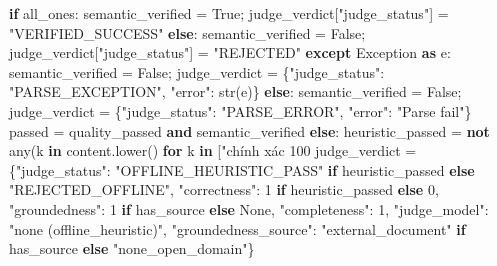 \documentclass[]{article}
\newenvironment{Shaded}{}{}
\newcommand{\BuiltInTok}[1]{#1}
\newcommand{\ConstantTok}[1]{\textcolor[rgb]{0.53,0.00,0.00}{#1}}
\newcommand{\ControlFlowTok}[1]{\textcolor[rgb]{0.00,0.44,0.13}{\textbf{#1}}}
\newcommand{\DataTypeTok}[1]{\textcolor[rgb]{0.56,0.13,0.00}{#1}}
\newcommand{\DecValTok}[1]{\textcolor[rgb]{0.25,0.63,0.44}{#1}}
\newcommand{\KeywordTok}[1]{\textcolor[rgb]{0.00,0.44,0.13}{\textbf{#1}}}
\newcommand{\NormalTok}[1]{#1}
\newcommand{\OperatorTok}[1]{\textcolor[rgb]{0.40,0.40,0.40}{#1}}
\newcommand{\StringTok}[1]{\textcolor[rgb]{0.25,0.44,0.63}{#1}}
\newcommand{\VariableTok}[1]{\textcolor[rgb]{0.10,0.09,0.49}{#1}}
\begin{document}
\begin{Shaded}
\begin{Highlighting}[]
\NormalTok{                    }\ControlFlowTok{if}\NormalTok{ all_ones:}
\NormalTok{                        semantic_verified }\OperatorTok{=} \ConstantTok{True}\NormalTok{; judge_verdict[}\StringTok{"judge_status"}\NormalTok{] }\OperatorTok{=} \StringTok{"VERIFIED_SUCCESS"}
\NormalTok{                    }\ControlFlowTok{else}\NormalTok{:}
\NormalTok{                        semantic_verified }\OperatorTok{=} \ConstantTok{False}\NormalTok{; judge_verdict[}\StringTok{"judge_status"}\NormalTok{] }\OperatorTok{=} \StringTok{"REJECTED"}
\NormalTok{                }\ControlFlowTok{except} \DataTypeTok{Exception} \KeywordTok{as}\NormalTok{ e:}
\NormalTok{                    semantic_verified }\OperatorTok{=} \ConstantTok{False}\NormalTok{; judge_verdict }\OperatorTok{=}\NormalTok{ \{}\StringTok{"judge_status"}\NormalTok{: }\StringTok{"PARSE_EXCEPTION"}\NormalTok{, }\StringTok{"error"}\NormalTok{: }\BuiltInTok{str}\NormalTok{(e)\}}
\NormalTok{            }\ControlFlowTok{else}\NormalTok{:}
\NormalTok{                semantic_verified }\OperatorTok{=} \ConstantTok{False}\NormalTok{; judge_verdict }\OperatorTok{=}\NormalTok{ \{}\StringTok{"judge_status"}\NormalTok{: }\StringTok{"PARSE_ERROR"}\NormalTok{, }\StringTok{"error"}\NormalTok{: }\StringTok{"Parse fail"}\NormalTok{\}}
\NormalTok{            passed }\OperatorTok{=}\NormalTok{ quality_passed }\KeywordTok{and}\NormalTok{ semantic_verified}
\NormalTok{        }\ControlFlowTok{else}\NormalTok{:}
\NormalTok{            heuristic_passed }\OperatorTok{=} \KeywordTok{not} \BuiltInTok{any}\NormalTok{(k }\KeywordTok{in}\NormalTok{ content.lower() }\ControlFlowTok{for}\NormalTok{ k }\KeywordTok{in}\NormalTok{ [}\StringTok{"chính xác 100%
\NormalTok{            judge_verdict }\OperatorTok{=}\NormalTok{ \{}\StringTok{"judge_status"}\NormalTok{: }\StringTok{"OFFLINE_HEURISTIC_PASS"}\NormalTok{ }\ControlFlowTok{if}\NormalTok{ heuristic_passed }\ControlFlowTok{else} \StringTok{"REJECTED_OFFLINE"}\NormalTok{,}
\NormalTok{                             }\StringTok{"correctness"}\NormalTok{: }\DecValTok{1}\NormalTok{ }\ControlFlowTok{if}\NormalTok{ heuristic_passed }\ControlFlowTok{else} \DecValTok{0}\NormalTok{, }\StringTok{"groundedness"}\NormalTok{: }\DecValTok{1}\NormalTok{ }\ControlFlowTok{if}\NormalTok{ has_source }\ControlFlowTok{else} \VariableTok{None}\NormalTok{,}
\NormalTok{                             }\StringTok{"completeness"}\NormalTok{: }\DecValTok{1}\NormalTok{, }\StringTok{"judge_model"}\NormalTok{: }\StringTok{"none (offline_heuristic)"}\NormalTok{,}
\NormalTok{                             }\StringTok{"groundedness_source"}\NormalTok{: }\StringTok{"external_document"}\NormalTok{ }\ControlFlowTok{if}\NormalTok{ has_source }\ControlFlowTok{else} \StringTok{"none_open_domain"}\NormalTok{\}}
}
\end{Highlighting}
\end{Shaded}
\end{document}
